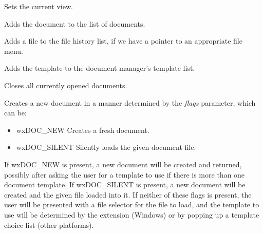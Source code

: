 
Sets the current view.


\label{wxdocmanageradddocument}


Adds the document to the list of documents.


\label{wxdocmanageraddfiletohistory}


Adds a file to the file history list, if we have a pointer to an appropriate file menu.


\label{wxdocmanagerassociatetemplate}


Adds the template to the document manager's template list.


\label{wxdocmanagerclosedocuments}


Closes all currently opened documents.


\label{wxdocmanagercreatedocument}


Creates a new document in a manner determined by the {\it flags} parameter, which can be:

\begin{itemize}\itemsep=0pt
\item wxDOC\_NEW Creates a fresh document.
\item wxDOC\_SILENT Silently loads the given document file.
\end{itemize}

If wxDOC\_NEW is present, a new document will be created and returned, possibly after
asking the user for a template to use if there is more than one document template.
If wxDOC\_SILENT is present, a new document will be created and the given file loaded
into it. If neither of these flags is present, the user will be presented with
a file selector for the file to load, and the template to use will be determined by the
extension (Windows) or by popping up a template choice list (other platforms).


